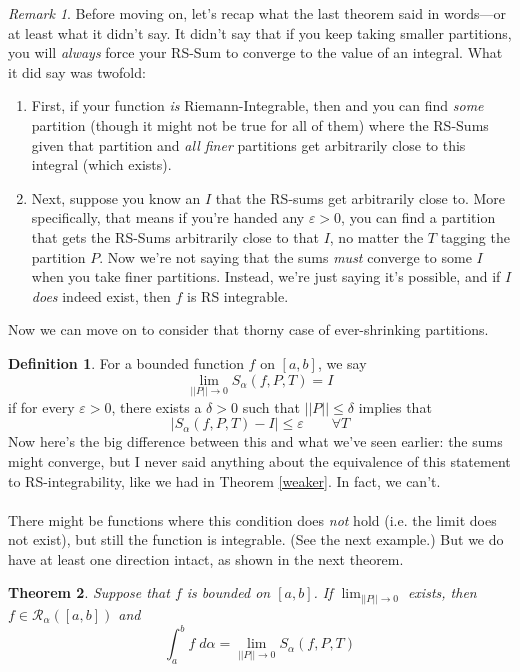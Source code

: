 \documentclass[12pt]{article}
\theoremstyle{plain}
\newtheorem{thm}{Theorem}[subsection]
\theoremstyle{definition}
\newtheorem{defn}[thm]{Definition}
\theoremstyle{remark}
\newtheorem*{rmk}{Remark}
\begin{document}
\begin{rmk}
Before moving on, let's recap what the last theorem said in words---or at least what it didn't say.  It didn't say that if you keep taking smaller partitions, you will \emph{always} force your RS-Sum to converge to the value of an integral.  What it did say was twofold:
\begin{enumerate}
    \item First, if your function \emph{is} Riemann-Integrable, then and you can find \emph{some} partition (though it might not be true for all of them) where the RS-Sums given that partition and \emph{all finer} partitions get arbitrarily close to this integral (which exists).
    \item Next, suppose you know an $I$ that the RS-sums get arbitrarily close to.  More specifically, that means if you're handed any $\varepsilon>0$, you can find a partition that gets the RS-Sums arbitrarily close to that $I$, no matter the $T$ tagging the partition $P$. Now we're not saying that the sums \emph{must} converge to some $I$ when you take finer partitions. Instead, we're just saying it's possible, and if $I$ \emph{does} indeed exist, then $f$ is RS integrable.
\end{enumerate}
Now we can move on to consider that thorny case of ever-shrinking partitions.
\end{rmk}
\begin{defn}
\label{strongest}
For a bounded function $f$ on $[a,b]$, we say 
    \[ \lim_{||P||\rightarrow 0} S_\alpha(f,P,T) = I \]
if for every $\varepsilon>0$, there exists a $\delta>0$ such that $||P||\leq\delta$ implies that
    \[ |S_\alpha(f,P,T) - I | \leq \varepsilon \qquad \forall T \]
    Now here's the big difference between this and what we've seen earlier: the sums might converge, but I never said anything about the equivalence of this statement to RS-integrability, like we had in Theorem \ref{weaker}.  In fact, we can't.
\\
\\
There might be functions where this condition does \emph{not} hold (i.e. the limit does not exist), but still the function is integrable. (See the next example.) But we do have at least one direction intact, as shown in the next theorem.
\end{defn}
\begin{thm}
\label{oneway}
Suppose that $f$ is bounded on $[a,b]$. If $\lim_{||P||\rightarrow 0}$ exists, then $f\in\mathscr{R}_\alpha([a,b])$ and
    \[ \int^b_a f\;d\alpha = \lim_{||P||\rightarrow 0} 
    S_\alpha(f,P,T) \]
\end{thm}
\end{document}
